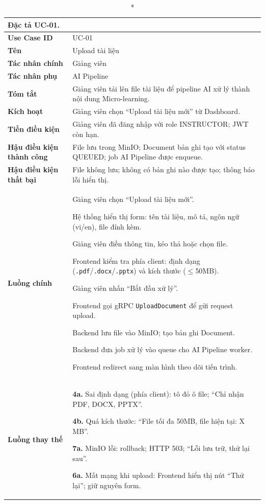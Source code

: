 \begin{longtable}{|p{3.5cm}|p{11cm}|}
    \caption*{Đặc tả UC-01.} \\
    \hline
    \textbf{Use Case ID} & UC-01 \\ \hline
    \textbf{Tên} & Upload tài liệu \\ \hline
    \textbf{Tác nhân chính} & Giảng viên \\ \hline
    \textbf{Tác nhân phụ} & AI Pipeline \\ \hline
    \textbf{Tóm tắt} & Giảng viên tải lên file tài liệu để pipeline AI xử lý thành nội dung Micro-learning. \\ \hline
    \textbf{Kích hoạt} & Giảng viên chọn ``Upload tài liệu mới'' từ Dashboard. \\ \hline
    \textbf{Tiền điều kiện} & Giảng viên đã đăng nhập với role INSTRUCTOR; JWT còn hạn. \\ \hline
    \textbf{Hậu điều kiện thành công} & File lưu trong MinIO; Document bản ghi tạo với status QUEUED; job AI Pipeline được enqueue. \\ \hline
    \textbf{Hậu điều kiện thất bại} & File không lưu; không có bản ghi nào được tạo; thông báo lỗi hiển thị. \\ \hline
    \textbf{Luồng chính} &
    \begin{flowenum}
        \item Giảng viên chọn ``Upload tài liệu mới''.
        \item Hệ thống hiển thị form: tên tài liệu, mô tả, ngôn ngữ (vi/en), file đính kèm.
        \item Giảng viên điền thông tin, kéo thả hoặc chọn file.
        \item Frontend kiểm tra phía client: định dạng (\texttt{.pdf}/\texttt{.docx}/\texttt{.pptx}) và kích thước ($\leq$50MB).
        \item Giảng viên nhấn ``Bắt đầu xử lý''.
        \item Frontend gọi gRPC \texttt{UploadDocument} để gửi request upload.
        \item Backend lưu file vào MinIO; tạo bản ghi Document.
        \item Backend đưa job xử lý vào queue cho AI Pipeline worker.
        \item Frontend redirect sang màn hình theo dõi tiến trình.
    \end{flowenum} \\ \hline
    \textbf{Luồng thay thế} &
    \begin{nobullets}
        \item \textbf{4a.} Sai định dạng (phía client): tô đỏ ô file; ``Chỉ nhận PDF, DOCX, PPTX''.
        \item \textbf{4b.} Quá kích thước: ``File tối đa 50MB, file hiện tại: X MB''.
        \item \textbf{7a.} MinIO lỗi: rollback; HTTP 503; ``Lỗi lưu trữ, thử lại sau''.
        \item \textbf{6a.} Mất mạng khi upload: Frontend hiển thị nút ``Thử lại''; giữ nguyên form.
    \end{nobullets} \\ \hline
\end{longtable}

